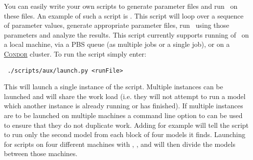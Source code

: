 You can easily write your own scripts to generate parameter files and run \glc\ on these files. An example of such a script is . This script will loop over a sequence of parameter values, generate appropriate parameter files, run \glc\ using those parameters and analyze the results. This script currently supports running of \glc\ on a local machine, via a PBS queue (as multiple jobs or a single job), or on a \href{https://research.cs.wisc.edu/htcondor/}{{\normalfont \scshape Condor}} cluster. To run the script simply enter:
\begin{verbatim}
 ./scripts/aux/launch.py <runFile>
\end{verbatim}
This will launch a single instance of the script. Multiple instances can be launched and will share the work load (i.e. they will not attempt to run a model which another instance is already running or has finished). If multiple instances are to be launched on multiple machines a command line option to  can be used to ensure that they do not duplicate work. Adding  for example will tell the script to run only the second model from each block of four models it finds. Launching for  scripts on four different machines with , ,  and  will then divide the models between those machines.

